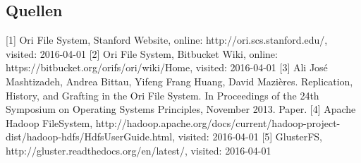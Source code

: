 \subsection{Quellen}
[1] Ori File System, Stanford Website, online: http://ori.scs.stanford.edu/, visited: 2016-04-01
[2] Ori File System, Bitbucket Wiki, online: https://bitbucket.org/orifs/ori/wiki/Home, visited: 2016-04-01
[3] Ali José Mashtizadeh, Andrea Bittau, Yifeng Frang Huang, David Mazières. Replication, History, and Grafting in the Ori File System. In Proceedings of the 24th Symposium on Operating Systems Principles, November 2013. Paper.
[4] Apache Hadoop FileSystem, http://hadoop.apache.org/docs/current/hadoop-project-dist/hadoop-hdfs/HdfsUserGuide.html, visited: 2016-04-01
[5] GlusterFS, http://gluster.readthedocs.org/en/latest/, visited: 2016-04-01

\clearpage
